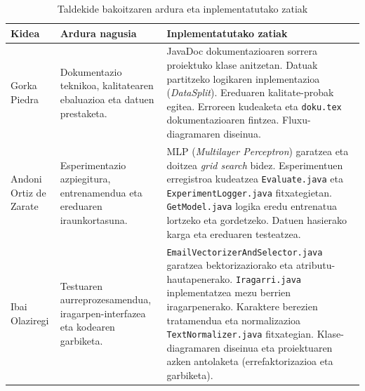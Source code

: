 \documentclass[12pt, a4paper]{article}
\begin{document}
\begin{table}[H]
    \centering
    \caption{Taldekide bakoitzaren ardura eta inplementatutako zatiak}
    \begin{tabular}{p{2.5cm}p{4cm}p{6.5cm}}
        \toprule
        \textbf{Kidea} & \textbf{Ardura nagusia} & \textbf{Inplementatutako zatiak} \\
        \midrule
        Gorka Piedra &
        Dokumentazio teknikoa, kalitatearen ebaluazioa eta datuen prestaketa. &
        \textbullet{} JavaDoc dokumentazioaren sorrera proiektuko klase anitzetan. \newline
        \textbullet{} Datuak partitzeko logikaren inplementazioa (\textit{DataSplit}). \newline
        \textbullet{} Ereduaren kalitate-probak egitea. \newline
        \textbullet{} Erroreen kudeaketa eta \texttt{doku.tex} dokumentazioaren fintzea. \newline
        \textbullet{} Fluxu-diagramaren diseinua. \\
        \midrule
        Andoni Ortiz de Zarate &
        Esperimentazio azpiegitura, entrenamendua eta ereduaren iraunkortasuna. &
        \textbullet{} MLP (\textit{Multilayer Perceptron}) garatzea eta doitzea \textit{grid search} bidez. \newline
        \textbullet{} Esperimentuen erregistroa kudeatzea \texttt{Evaluate.java} eta \texttt{ExperimentLogger.java} fitxategietan. \newline
        \textbullet{} \texttt{GetModel.java} logika eredu entrenatua lortzeko eta gordetzeko. \newline
        \textbullet{} Datuen hasierako karga eta ereduaren testeatzea. \\
        \midrule
        Ibai Olaziregi &
        Testuaren aurreprozesamendua, iragarpen-interfazea eta kodearen garbiketa. &
        \textbullet{} \texttt{EmailVectorizerAndSelector.java} garatzea bektorizaziorako eta atributu-hautapenerako. \newline
        \textbullet{} \texttt{Iragarri.java} inplementatzea mezu berrien iragarpenerako. \newline
        \textbullet{} Karaktere berezien tratamendua eta normalizazioa \texttt{TextNormalizer.java} fitxategian. \newline
        \textbullet{} Klase-diagramaren diseinua eta proiektuaren azken antolaketa (errefaktorizazioa eta garbiketa). \\
        \bottomrule
    \end{tabular}
    \label{tab:ardura}
\end{table}
\end{document}
